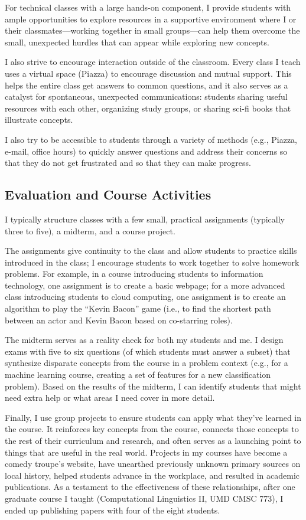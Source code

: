 \documentclass[11pt]{amsart}
\begin{document}
For technical classes with a large hands-on component, I provide
students with ample opportunities to explore resources in a supportive
environment where I or their classmates---working together in small
groups---can help them overcome the small, unexpected hurdles that can
appear while exploring new concepts.

I also strive to encourage interaction outside of the classroom.  Every class I
teach uses a virtual space (Piazza) to encourage discussion and mutual support.  This
helps the entire class get answers to common questions, and it also serves as a
catalyst for spontaneous, unexpected communications: students sharing useful
resources with each other, organizing study groups, or sharing sci-fi books that
illustrate concepts.

I also try to be accessible to students through a variety of methods (e.g.,
Piazza, e-mail, office hours) to quickly answer questions and address their
concerns so that they do not get frustrated and so that they can make progress.

\subsection{Evaluation and Course Activities}

I typically structure classes with a few small, practical assignments (typically
three to five), a midterm, and a course project.

The assignments give continuity to the class and allow students to practice
skills introduced in the class; I encourage students to work together to solve
homework problems.  For example, in a course introducing students to information
technology, one assignment is to create a basic webpage; for a more advanced
class introducing students to cloud computing, one assignment is to create an
algorithm to play the ``Kevin Bacon'' game (i.e., to find the shortest path
between an actor and Kevin Bacon based on co-starring roles).

The midterm serves as a reality check for both my students and me.  I design
exams with five to six questions (of which students must answer a subset) that
synthesize disparate concepts from the course in a problem context (e.g., for a
machine learning course, creating a set of features for a new classification
problem).  Based on the results of the midterm, I can identify students that
might need extra help or what areas I need cover in more detail.

Finally, I use group projects to ensure students can apply what
they've learned in the course.  It reinforces key concepts from the
course, connects those concepts to the rest of their curriculum and
research, and often serves as a launching point to things that are
useful in the real world.  Projects in my courses have become a comedy
troupe's website, have unearthed previously unknown primary sources on
local history, helped students advance in the workplace, and resulted
in academic publications.  As a testament to the effectiveness of
these relationships, after one graduate course I taught (Computational
Linguistics II, UMD CMSC 773), I ended up publishing papers with four
of the eight students.
\end{document}
